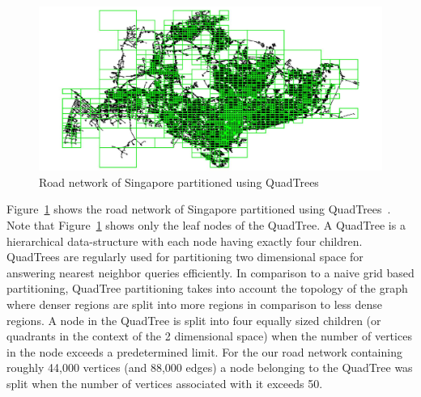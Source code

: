 \documentclass{wscpaperproc}
\theoremstyle{wsc}
\begin{document}
\begin{figure}[h]
 \centering
 \includegraphics[scale=0.7]{QuadTree_partion.pdf}
 \caption{Road network of Singapore partitioned using QuadTrees}
 \label{fig:quadtree}
\end{figure}

Figure~\ref{fig:quadtree} shows the road network of Singapore partitioned using QuadTrees~\cite{finkel1974quad}. Note that Figure~\ref{fig:quadtree} shows only the leaf nodes of the QuadTree. A QuadTree is a hierarchical data-structure with each node having exactly four children.  QuadTrees are regularly used for partitioning two dimensional space for answering nearest neighbor queries efficiently. In comparison to a naive grid based partitioning, QuadTree partitioning takes into account the topology of the graph where denser regions are split into more regions in comparison to less dense regions. A node in the QuadTree is split into four equally sized children (or quadrants in the context of the 2 dimensional space) when the number of vertices in the node exceeds a predetermined limit. For the our road network containing roughly 44,000 vertices (and 88,000 edges) a node belonging to the QuadTree was split when the number of vertices associated with it exceeds 50.
\end{document}
